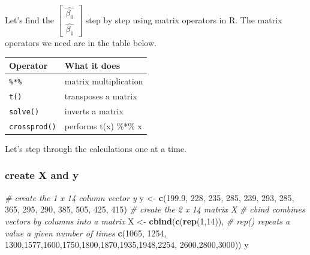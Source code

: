 \documentclass[]{book}
\newenvironment{Shaded}{\begin{snugshade}}{\end{snugshade}}
\newcommand{\CommentTok}[1]{\textcolor[rgb]{0.56,0.35,0.01}{\textit{#1}}}
\newcommand{\DecValTok}[1]{\textcolor[rgb]{0.00,0.00,0.81}{#1}}
\newcommand{\FloatTok}[1]{\textcolor[rgb]{0.00,0.00,0.81}{#1}}
\newcommand{\KeywordTok}[1]{\textcolor[rgb]{0.13,0.29,0.53}{\textbf{#1}}}
\newcommand{\NormalTok}[1]{#1}
\newcommand{\StringTok}[1]{\textcolor[rgb]{0.31,0.60,0.02}{#1}}
\begin{document}
Let's find the \(\begin{bmatrix} \hat{\beta_0} \\ \hat{\beta_1} \end{bmatrix}\) step by step using matrix operators in R. The matrix operators we need are in the table below.

\begin{longtable}[]{@{}ll@{}}
\toprule
Operator & What it does\tabularnewline
\midrule
\endhead
\texttt{\%*\%} & matrix multiplication\tabularnewline
\texttt{t()} & transposes a matrix\tabularnewline
\texttt{solve()} & inverts a matrix\tabularnewline
\texttt{crossprod()} & performs t(x) \%*\% x\tabularnewline
\bottomrule
\end{longtable}

Let's step through the calculations one at a time.

\hypertarget{create-x-and-y}{%
\subsubsection{create X and y}\label{create-x-and-y}}

\begin{Shaded}
\begin{Highlighting}[]
\CommentTok{# create the 1 x 14 column vector y}
\NormalTok{y <-}\StringTok{ }\KeywordTok{c}\NormalTok{(}\FloatTok{199.9}\NormalTok{, }\DecValTok{228}\NormalTok{, }\DecValTok{235}\NormalTok{, }\DecValTok{285}\NormalTok{, }\DecValTok{239}\NormalTok{, }\DecValTok{293}\NormalTok{, }\DecValTok{285}\NormalTok{, }\DecValTok{365}\NormalTok{, }\DecValTok{295}\NormalTok{, }\DecValTok{290}\NormalTok{, }\DecValTok{385}\NormalTok{, }\DecValTok{505}\NormalTok{, }\DecValTok{425}\NormalTok{, }\DecValTok{415}\NormalTok{)}
\CommentTok{# create the 2 x 14 matrix X}
\CommentTok{# cbind combines vectors by columns into a matrix}
\NormalTok{X <-}\StringTok{ }\KeywordTok{cbind}\NormalTok{(}\KeywordTok{c}\NormalTok{(}\KeywordTok{rep}\NormalTok{(}\DecValTok{1}\NormalTok{,}\DecValTok{14}\NormalTok{)), }\CommentTok{# rep() repeats a value a given number of times}
           \KeywordTok{c}\NormalTok{(}\DecValTok{1065}\NormalTok{, }\DecValTok{1254}\NormalTok{, }\DecValTok{1300}\NormalTok{,}\DecValTok{1577}\NormalTok{,}\DecValTok{1600}\NormalTok{,}\DecValTok{1750}\NormalTok{,}\DecValTok{1800}\NormalTok{,}\DecValTok{1870}\NormalTok{,}\DecValTok{1935}\NormalTok{,}\DecValTok{1948}\NormalTok{,}\DecValTok{2254}\NormalTok{, }\DecValTok{2600}\NormalTok{,}\DecValTok{2800}\NormalTok{,}\DecValTok{3000}\NormalTok{))}
\NormalTok{y}
\end{Highlighting}
\end{Shaded}
\end{document}
